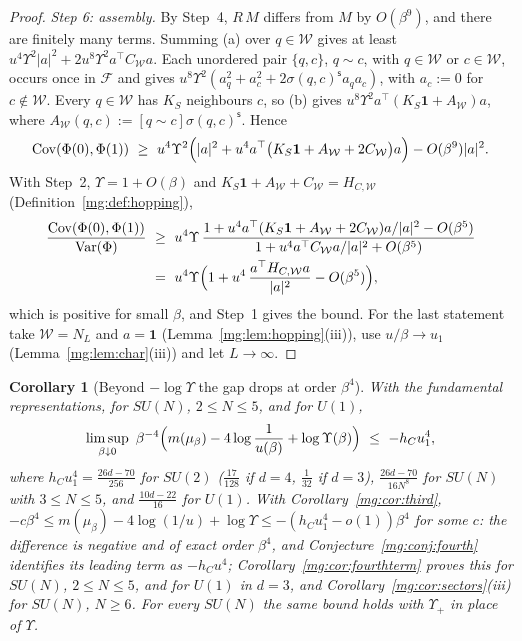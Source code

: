 \documentclass[11pt,a4paper]{article}
\newtheorem{corollary}[theorem]{Corollary}
\theoremstyle{definition}
\theoremstyle{remark}
\DeclareMathOperator{\Cov}{Cov}
\DeclareMathOperator{\Var}{Var}
\begin{document}
\begin{proof}
\emph{Step 6: assembly.} By Step~4, $R\,M$ differs from $M$ by $O(\beta^9)$, and there are finitely many terms. Summing (a) over $q\in\mathcal W$ gives at least
$u^4\Upsilon^2|a|^2+2u^8\Upsilon^2a^\top C_{\mathcal W}a$. Each unordered pair $\{q,c\}$, $q\sim c$, with $q\in\mathcal W$ or $c\in\mathcal W$, occurs once in
$\mathcal F$ and gives $u^8\Upsilon^2(a_q^2+a_c^2+2\sigma(q,c)^{\mathsf s}a_qa_c)$, with $a_c:=0$ for $c\notin\mathcal W$. Every $q\in\mathcal W$ has $K_S$
neighbours $c$, so (b) gives $u^8\Upsilon^2a^\top(K_S\mathbf 1+A_{\mathcal W})a$, where $A_{\mathcal W}(q,c):=[q\sim c]\sigma(q,c)^{\mathsf s}$. Hence
\[
\Cov(\Phi(0),\Phi(1))\ \ge\ u^4\Upsilon^2\Bigl(|a|^2+u^4a^\top\bigl(K_S\mathbf 1+A_{\mathcal W}+2C_{\mathcal W}\bigr)a\Bigr)-O(\beta^9)|a|^2 .
\]
With Step~2, $\Upsilon=1+O(\beta)$ and $K_S\mathbf 1+A_{\mathcal W}+C_{\mathcal W}=H_{C,\mathcal W}$ (Definition~\ref{mg:def:hopping}),
\begin{align*}
\frac{\Cov(\Phi(0),\Phi(1))}{\Var(\Phi)}\ &\ge\ u^4\Upsilon\,\frac{1+u^4a^\top(K_S\mathbf 1+A_{\mathcal W}+2C_{\mathcal W})a/|a|^2-O(\beta^5)}{1+u^4a^\top C_{\mathcal W}a/|a|^2+O(\beta^5)}\\
&=\ u^4\Upsilon\Bigl(1+u^4\,\frac{a^\top H_{C,\mathcal W}a}{|a|^2}-O(\beta^5)\Bigr),
\end{align*}
which is positive for small $\beta$, and Step~1 gives the bound. For the last statement take $\mathcal W=N_L$ and $a=\mathbf 1$
(Lemma~\ref{mg:lem:hopping}(iii)), use $u/\beta\to u_1$ (Lemma~\ref{mg:lem:char}(iii)) and let $L\to\infty$.
\end{proof}

\begin{corollary}[Beyond $-\log\Upsilon$ the gap drops at order $\beta^4$]\label{mg:cor:fourthupper}
With the fundamental representations, for $SU(N)$, $2\le N\le5$, and for $U(1)$,
\[
\limsup_{\beta\downarrow0}\ \beta^{-4}\Bigl(m(\mu_\beta)-4\log\frac1{u(\beta)}+\log\Upsilon(\beta)\Bigr)\ \le\ -h_Cu_1^4,
\]
where $h_Cu_1^4=\frac{26d-70}{256}$ for $SU(2)$ ($\frac{17}{128}$ if $d=4$, $\frac1{32}$ if $d=3$), $\frac{26d-70}{16N^8}$ for $SU(N)$ with $3\le N\le5$, and
$\frac{10d-22}{16}$ for $U(1)$. With Corollary~\ref{mg:cor:third}, $-c\beta^4\le m(\mu_\beta)-4\log(1/u)+\log\Upsilon\le-(h_Cu_1^4-o(1))\beta^4$ for some $c$:
the difference is negative and of exact order $\beta^4$, and Conjecture~\ref{mg:conj:fourth} identifies its leading term as $-h_Cu^4$; Corollary~\ref{mg:cor:fourthterm}
proves this for $SU(N)$, $2\le N\le5$, and for $U(1)$ in $d=3$, and Corollary~\ref{mg:cor:sectors}(iii) for $SU(N)$, $N\ge6$. For every $SU(N)$
the same bound holds with $\Upsilon_+$ in place of $\Upsilon$.
\end{corollary}
\end{document}
